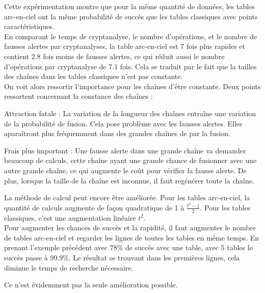 	Cette expérimentation montre que pour la même quantité de données, les tables arc-en-ciel ont la même probabilité de succès que les tables classiques avec points caractéristiques.\\

	En comparant le temps de cryptanalyse, le nombre d'opérations, et le nombre de fausses alertes par cryptanalyses, la table arc-en-ciel est 7 fois plus rapides et contient 2.8 fois moins de fausses alertes, ce qui réduit aussi le nombre d'opérations par cryptanalyse de 7.1 fois. Cela se traduit par le fait que la tailles des chaînes dans les tables classiques n'est pas constante.\\

	On voit alors ressortir l'importance pour les chaînes d'être constante. Deux points ressortent concernant la constance des chaînes\cite{Oech03} :

	\bi
		\item Attraction fatale : La variation de la longueur des chaînes entraîne une variation de la probabilité de fusion. Cela pose problème avec les fausses alertes. Elles aparaîtront plus fréquemment dans des grandes chaînes de par la fusion.
		\item Frais plus important : Une fausse alerte dans une grande chaîne va demander beaucoup de calculs, cette chaîne ayant une grande chance de fusionner avec une autre grande chaîne, ce qui augmente le coût pour vérifier la fausse alerte. De plus, lorsque la taille de la chaîne est inconnue, il faut regénérer toute la chaîne.\\
	\ei

	La méthode de calcul peut encore être améliorée. Pour les tables arc-en-ciel, la quantité de calculs augmente de façon quadratique de 1 à $\frac{t^2-1}{2}$. Pour les tables classiques, c'est une augmentation linéaire $t^2$.\\

	Pour augmenter les chances de succès et la rapidité, il faut augmenter le nombre de tables arc-en-ciel et regarder les lignes de toutes les tables en même temps. En prenant l'exemple précédent avec 78\% de succès avec une table, avec 5 tables le succès passe à 99.9\%. Le résultat se trouvant dans les premières lignes, cela diminue le temps de recherche nécessaire.

	Ce n'est évidemment pas la seule amélioration possible.

\endinput{}
